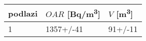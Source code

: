 \begin{tabular}{lll}
\toprule
podlazi & $OAR$ [\si{Bq/m^3}] & $V$ [\si{m^3}] \\
\midrule
1 &           1357+/-41 &        91+/-11 \\
\bottomrule
\end{tabular}
